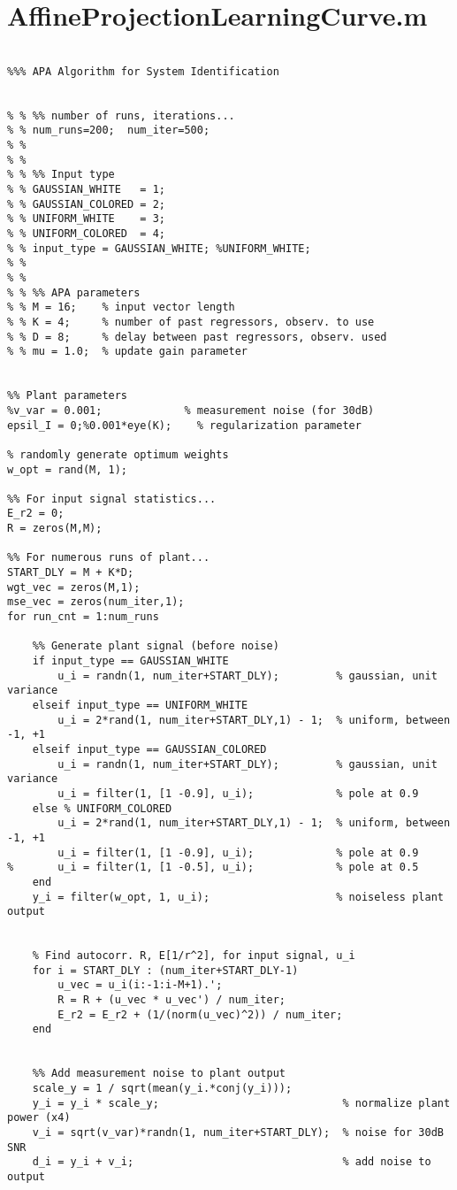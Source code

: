 \section{AffineProjectionLearningCurve.m}
\begin{lstlisting}

%%% APA Algorithm for System Identification


% % %% number of runs, iterations...
% % num_runs=200;  num_iter=500;
% %
% %
% % %% Input type
% % GAUSSIAN_WHITE   = 1;
% % GAUSSIAN_COLORED = 2;
% % UNIFORM_WHITE    = 3;
% % UNIFORM_COLORED  = 4;
% % input_type = GAUSSIAN_WHITE; %UNIFORM_WHITE;
% %
% %
% % %% APA parameters
% % M = 16;    % input vector length
% % K = 4;     % number of past regressors, observ. to use
% % D = 8;     % delay between past regressors, observ. used
% % mu = 1.0;  % update gain parameter


%% Plant parameters
%v_var = 0.001;             % measurement noise (for 30dB)
epsil_I = 0;%0.001*eye(K);    % regularization parameter

% randomly generate optimum weights
w_opt = rand(M, 1);

%% For input signal statistics...
E_r2 = 0;
R = zeros(M,M);

%% For numerous runs of plant...
START_DLY = M + K*D;
wgt_vec = zeros(M,1);
mse_vec = zeros(num_iter,1);
for run_cnt = 1:num_runs

    %% Generate plant signal (before noise)
    if input_type == GAUSSIAN_WHITE
        u_i = randn(1, num_iter+START_DLY);         % gaussian, unit variance
    elseif input_type == UNIFORM_WHITE
        u_i = 2*rand(1, num_iter+START_DLY,1) - 1;  % uniform, between -1, +1
    elseif input_type == GAUSSIAN_COLORED
        u_i = randn(1, num_iter+START_DLY);         % gaussian, unit variance
        u_i = filter(1, [1 -0.9], u_i);             % pole at 0.9
    else % UNIFORM_COLORED
        u_i = 2*rand(1, num_iter+START_DLY,1) - 1;  % uniform, between -1, +1
        u_i = filter(1, [1 -0.9], u_i);             % pole at 0.9
%       u_i = filter(1, [1 -0.5], u_i);             % pole at 0.5
    end
    y_i = filter(w_opt, 1, u_i);                    % noiseless plant output


    % Find autocorr. R, E[1/r^2], for input signal, u_i
    for i = START_DLY : (num_iter+START_DLY-1)
        u_vec = u_i(i:-1:i-M+1).';
        R = R + (u_vec * u_vec') / num_iter;
        E_r2 = E_r2 + (1/(norm(u_vec)^2)) / num_iter;
    end


    %% Add measurement noise to plant output
    scale_y = 1 / sqrt(mean(y_i.*conj(y_i)));
    y_i = y_i * scale_y;                             % normalize plant power (x4)
    v_i = sqrt(v_var)*randn(1, num_iter+START_DLY);  % noise for 30dB SNR
    d_i = y_i + v_i;                                 % add noise to output


\end{lstlisting}
